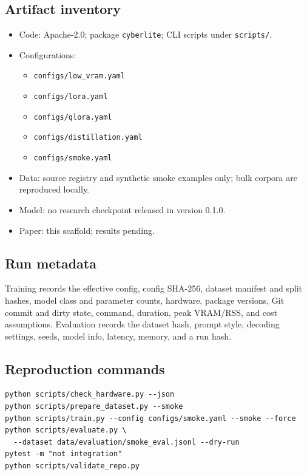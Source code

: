 \subsection{Artifact inventory}

\begin{itemize}[leftmargin=1.4em]
  \item Code: Apache-2.0; package \texttt{cyberlite}; CLI scripts under
  \texttt{scripts/}.
  \item Configurations:
  \begin{itemize}
    \item \texttt{configs/low\_vram.yaml}
    \item \texttt{configs/lora.yaml}
    \item \texttt{configs/qlora.yaml}
    \item \texttt{configs/distillation.yaml}
    \item \texttt{configs/smoke.yaml}
  \end{itemize}
  \item Data: source registry and synthetic smoke examples only; bulk corpora
  are reproduced locally.
  \item Model: no research checkpoint released in version 0.1.0.
  \item Paper: this scaffold; results pending.
\end{itemize}

\subsection{Run metadata}

Training records the effective config, config SHA-256, dataset manifest and split
hashes, model class and parameter counts, hardware, package versions, Git commit
and dirty state, command, duration, peak VRAM/RSS, and cost assumptions.
Evaluation records the dataset hash, prompt style, decoding settings, seeds,
model info, latency, memory, and a run hash.

\subsection{Reproduction commands}

\begin{verbatim}
python scripts/check_hardware.py --json
python scripts/prepare_dataset.py --smoke
python scripts/train.py --config configs/smoke.yaml --smoke --force
python scripts/evaluate.py \
  --dataset data/evaluation/smoke_eval.jsonl --dry-run
pytest -m "not integration"
python scripts/validate_repo.py
\end{verbatim}

